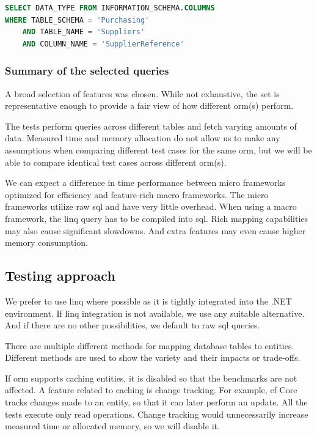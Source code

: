 \begin{lstlisting}[language=SQL]
SELECT DATA_TYPE FROM INFORMATION_SCHEMA.COLUMNS 
WHERE TABLE_SCHEMA = 'Purchasing'
    AND TABLE_NAME = 'Suppliers'
    AND COLUMN_NAME = 'SupplierReference'
\end{lstlisting}

\subsubsection{Summary of the selected queries}
A broad selection of features was chosen. While not exhaustive, the set is representative enough to provide a fair view of how different \acrshort{orm}(s) perform.

The tests perform queries across different tables and fetch varying amounts of data. 
Measured time and memory allocation do not allow us to make any assumptions when comparing different test cases for the same \acrshort{orm}, but we will be able to compare identical test cases across different \acrshort{orm}(s).

We can expect a difference in time performance between micro frameworks optimized for efficiency and feature-rich macro frameworks.
The micro frameworks utilize raw \acrshort{sql} and have very little overhead. When using a macro framework, the \acrshort{linq} query has to be compiled into \acrshort{sql}. Rich mapping capabilities may also cause significant slowdowns. And extra features may even cause higher memory consumption.

\subsection{Testing approach}
\label{sec:testing_approach}
We prefer to use \acrshort{linq} where possible as it is tightly integrated into the .NET environment. 
If \acrshort{linq} integration is not available, we use any suitable alternative. And if there are no other possibilities, we default to raw \acrshort{sql} queries. 

There are multiple different methods for mapping database tables to entities. Different methods are used to show the variety and their impacts or trade-offs. 

If \acrshort{orm} supports caching entities, it is disabled so that the benchmarks are not affected. 
A feature related to caching is change tracking. For example, \acrshort{ef} Core tracks changes made to an entity, so that it can later perform an update. All the tests execute only read operations. Change tracking would unnecessarily increase measured time or allocated memory, so we will disable it.

